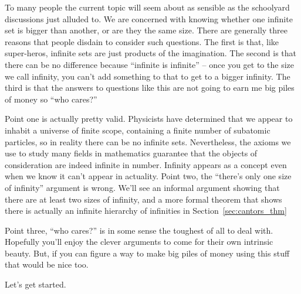 To many people the current topic will seem about as sensible as the schoolyard
discussions just alluded to.  We are concerned with knowing whether
one infinite set is bigger than another, or are they the same size. There are
generally three reasons that people disdain to consider such questions.  The
first is that, like super-heros, infinite sets are just products of the imagination.
The second is that there can be no difference because ``infinite is infinite'' -- 
once you get to the size we call infinity, you can't add something to that to
get to a bigger infinity. The third is that the answers to questions like this
are not going to earn me big piles of money so ``who cares?''

Point one is actually pretty valid.  Physicists have determined that we
appear to inhabit a universe of finite scope, containing a finite number of
subatomic particles, so in reality there can be no infinite sets.  Nevertheless,
the axioms we use to study many fields in mathematics guarantee that the
objects of consideration are indeed infinite in number.  Infinity appears as a
concept even when we know it can't appear in actuality.
Point two, the ``there's only one size of infinity'' argument is wrong.  We'll
see an informal argument showing that there are at least two sizes of infinity,
and a more formal theorem that shows there is actually an infinite hierarchy
of infinities in Section~\ref{sec:cantors_thm}

Point three, ``who cares?'' is in some sense the toughest of all to deal with.
Hopefully you'll enjoy the clever arguments to come for their own intrinsic
beauty. But, if you can figure a way to make big piles of money using this
stuff that would be nice too.

Let's get started.

